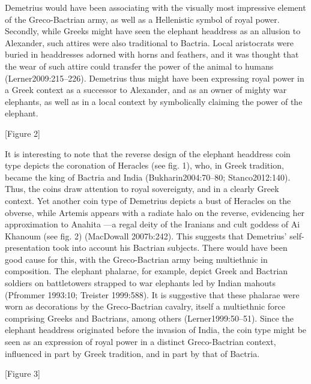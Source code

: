 \documentclass{ijsra}
\begin{document}
Demetrius would have been associating with the visually most impressive element of the Greco-Bactrian army,
as well as a Hellenistic symbol of royal power.
Secondly, while Greeks might have seen the elephant headdress as an allusion to Alexander, such attires were also traditional to Bactria.
Local aristocrats were buried in headdresses adorned with horns and feathers,
and it was thought that the wear of such attire could transfer the power of the animal to humans (Lerner2009:215–226).
Demetrius thus might have been expressing royal power in a Greek context as a successor to Alexander,
and as an owner of mighty war elephants, as well as in a local context by symbolically claiming the power of the elephant.

[Figure 2]

It is interesting to note that the reverse design of the elephant headdress coin type depicts the coronation of Heracles (see fig. 1),
who, in Greek tradition, became the king of Bactria and India (Bukharin2004:70–80; Stanco2012:140).
Thus, the coins draw attention to royal sovereignty, and in a clearly Greek context.
Yet another coin type of Demetrius depicts a bust of Heracles on the obverse, while Artemis appears with a radiate halo on the reverse,
evidencing her approximation to Anahita —a regal deity of the Iranians and cult goddess of Ai Khanoum (see fig. 2) (MacDowall 2007b:242).
This suggests that Demetrius’ self-presentation took into account his Bactrian subjects.
There would have been good cause for this, with the Greco-Bactrian army being multiethnic in composition.
The elephant phalarae, for example, depict Greek and Bactrian soldiers on battletowers strapped to war elephants led by Indian mahouts
(Pfrommer 1993:10; Treister 1999:588).
It is suggestive that these phalarae were worn as decorations by the Greco-Bactrian cavalry, itself a multiethnic force comprising
Greeks and Bactrians, among others (Lerner1999:50–51).
Since the elephant headdress originated before the invasion of India, the coin type might be seen as an expression of royal power
in a distinct Greco-Bactrian context, influenced in part by Greek tradition, and in part by that of Bactria.

[Figure 3]
\end{document}
